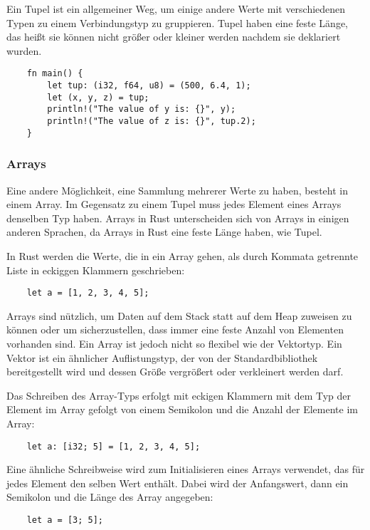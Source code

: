 Ein Tupel ist ein allgemeiner Weg, um einige andere Werte mit verschiedenen Typen zu einem Verbindungstyp zu gruppieren. Tupel haben eine feste Länge, das heißt sie können nicht größer oder kleiner werden nachdem sie deklariert wurden.

\begin{lstlisting}
    fn main() {
        let tup: (i32, f64, u8) = (500, 6.4, 1);
        let (x, y, z) = tup;
        println!("The value of y is: {}", y);
        println!("The value of z is: {}", tup.2);
    }
\end{lstlisting}

\subsubsection{Arrays}

Eine andere Möglichkeit, eine Sammlung mehrerer Werte zu haben, besteht in einem Array. Im Gegensatz zu einem Tupel muss jedes Element eines Arrays denselben Typ haben. Arrays in Rust unterscheiden sich von Arrays in einigen anderen Sprachen, da Arrays in Rust eine feste Länge haben, wie Tupel.

In Rust werden die Werte, die in ein Array gehen, als durch Kommata getrennte Liste in eckiggen Klammern geschrieben:

\begin{lstlisting}
    let a = [1, 2, 3, 4, 5];
\end{lstlisting}

Arrays sind nützlich, um Daten auf dem Stack statt auf dem Heap zuweisen zu können oder um sicherzustellen, dass immer eine feste Anzahl von Elementen vorhanden sind. Ein Array ist jedoch nicht so flexibel wie der Vektortyp. Ein Vektor ist ein ähnlicher Auflistungstyp, der von der Standardbibliothek bereitgestellt wird und dessen Größe vergrößert oder verkleinert werden darf.

Das Schreiben des Array-Typs erfolgt mit eckigen Klammern mit dem Typ der Element im Array gefolgt von einem Semikolon und die Anzahl der Elemente im Array:

\begin{lstlisting}
    let a: [i32; 5] = [1, 2, 3, 4, 5];
\end{lstlisting}

Eine ähnliche Schreibweise wird zum Initialisieren eines Arrays verwendet, das für jedes Element den selben Wert enthält. Dabei wird der Anfangswert, dann ein Semikolon und die Länge des Array angegeben:

\begin{lstlisting}
    let a = [3; 5];
\end{lstlisting}

